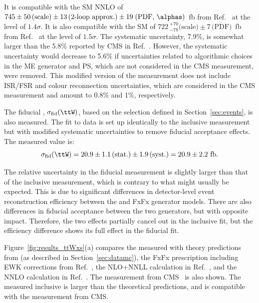 \documentclass[cernpreprint, atlasdraft=false, texlive=2023, UKenglish, texmf, orcidlogo]{atlasdoc}
\begin{document}
It is compatible with the SM NNLO \xs of $745\pm 50\,\textrm{(scale)}\pm 13\,\textrm{(2-loop approx.)}\pm 19\;\textrm{(PDF, \alphas)}$~fb from Ref.~\cite{Buonocore_2023} at the level of $1.4\sigma$. It is also compatible with the SM \xs of $722\,^{+70}_{-78}\textrm{(scale)}\pm 7\,\textrm{(PDF)}$~fb from Ref.~\cite{Frederix:2021agh} at the level of $1.5\sigma$.
The systematic uncertainty, 7.9\%, is somewhat larger than the 5.8\% reported by CMS
in Ref.~\cite{CMS-TOP-21-011}. However, the systematic uncertainty would decrease to 5.6\%
if uncertainties related to algorithmic choices in the \ttW ME generator and PS,
which are not considered in the CMS measurement, were removed.
This modified version of the measurement does not include
ISR/FSR and colour reconnection \ttW uncertainties, which are considered in
the CMS measurement and amount to 0.8\% and 1\%, respectively.
 
 
The fiducial \ttW \xs, $\sigma_{\textrm{fid}}(\ttW)$, based on the selection
defined in Section~\ref{sec:events}, is also measured. The fit to data is set
up identically to the inclusive \xs measurement but with modified
systematic uncertainties to remove fiducial acceptance effects.
The measured value is:
\begin{equation*}
\sigma_{\textrm{fid}}(\ttW) = 20.9\pm1.1\,\mathrm{(stat.)}\pm1.9\,\mathrm{(syst.)} = 20.9\pm2.2~\mathrm{fb}.
\label{eq:ttwxsfid}
\end{equation*}
 
The relative uncertainty in the fiducial \xs measurement is slightly larger
than that of the inclusive measurement, which is contrary to what might
usually be expected. This is due to significant differences
in detector-level event reconstruction efficiency between the \Sherpa and \MGPY[8] FxFx \ttW generator models.
There are also differences in fiducial acceptance between the two generators,
but with opposite impact. Therefore, the two effects partially cancel out in the inclusive fit,
but the efficiency difference shows its full effect in the fiducial fit.
 
 
 
Figure~\ref{fig:results_ttWxs}(a) compares the
measured \ttW \xs with theory predictions from \SHERPA (as described in
Section~\ref{sec:datamc}), the \MGPY[8] FxFx prescription including
EWK corrections from Ref.~\cite{Frederix:2021agh}, the NLO+NNLL
calculation in Ref.~\cite{Kulesza:2020nfh}, and the NNLO calculation in
Ref.~\cite{Buonocore_2023}. The measurement from
CMS~\cite{CMS-TOP-21-011} is also shown.  The measured inclusive \xs
is larger than the theoretical predictions, and is compatible with the
measurement from CMS.
 
\end{document}
